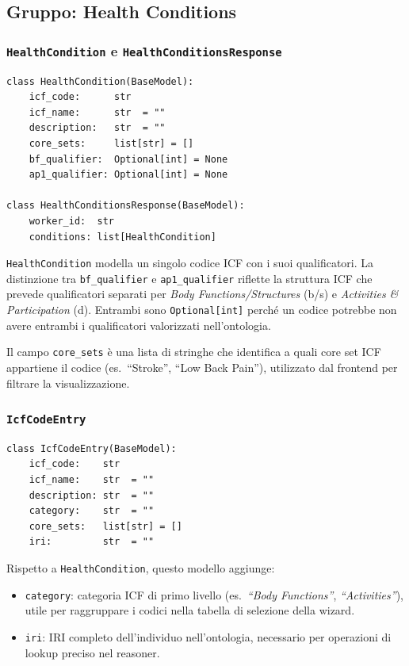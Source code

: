 \documentclass[a4paper,12pt]{article}
\begin{document}
\subsection{Gruppo: Health Conditions}

\subsubsection{\texttt{HealthCondition} e \texttt{HealthConditionsResponse}}

\begin{lstlisting}[caption={Condizione di salute ICF di un lavoratore.}]
class HealthCondition(BaseModel):
    icf_code:      str
    icf_name:      str  = ""
    description:   str  = ""
    core_sets:     list[str] = []
    bf_qualifier:  Optional[int] = None
    ap1_qualifier: Optional[int] = None

class HealthConditionsResponse(BaseModel):
    worker_id:  str
    conditions: list[HealthCondition]
\end{lstlisting}

\noindent \texttt{HealthCondition} modella un singolo codice ICF con i suoi
qualificatori. La distinzione tra \texttt{bf\_qualifier} e
\texttt{ap1\_qualifier} riflette la struttura ICF che prevede
qualificatori separati per \textit{Body Functions/Structures} (b/s) e
\textit{Activities \& Participation} (d). Entrambi sono \texttt{Optional[int]}
perch\'{e} un codice potrebbe non avere entrambi i qualificatori
valorizzati nell'ontologia.

Il campo \texttt{core\_sets} \`{e} una lista di stringhe che identifica
a quali core set ICF appartiene il codice (es.\ ``Stroke'',
``Low Back Pain''), utilizzato dal frontend per filtrare la visualizzazione.

\subsubsection{\texttt{IcfCodeEntry}}

\begin{lstlisting}[caption={\texttt{IcfCodeEntry} --- catalogo ICF per la procedura guidata.}]
class IcfCodeEntry(BaseModel):
    icf_code:    str
    icf_name:    str  = ""
    description: str  = ""
    category:    str  = ""
    core_sets:   list[str] = []
    iri:         str  = ""
\end{lstlisting}

\noindent Rispetto a \texttt{HealthCondition}, questo modello aggiunge:
\begin{itemize}[noitemsep]
  \item \texttt{category}: categoria ICF di primo livello (es.\
        \textit{``Body Functions''}, \textit{``Activities''}), utile
        per raggruppare i codici nella tabella di selezione della wizard.
  \item \texttt{iri}: IRI completo dell'individuo nell'ontologia, necessario
        per operazioni di lookup preciso nel reasoner.
\end{itemize}
\end{document}
